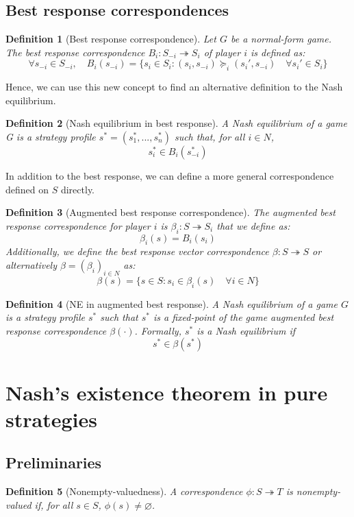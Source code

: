 \documentclass[12pt]{report}
\newtheorem{definition}{Definition}[chapter]
\begin{document}
\subsection{Best response correspondences}

\begin{definition}[Best response correspondence]
Let $G$ be a normal-form game. The best response correspondence $B_i : S_{-i} \twoheadrightarrow S_i$ of player $i$ is defined as: $$\forall s_{-i}\in S_{-i},\quad B_i(s_{-i}) = \{s_i \in S_i : (s_i, s_{-i}) \succeq_i (s_i',s_{-i}) \quad \forall s_i'\in S_i\} $$
\end{definition}
Hence, we can use this new concept to find an alternative definition to the Nash equilibrium.
\begin{definition}[Nash equilibrium in best response]
A Nash equilibrium of a game G is a strategy profile $s^* = (s_1^*, ..., s_n^*)$ such that, for all $i \in N$, $$s_i^*\in B_i(s_{-i}^*)$$
\end{definition}
In addition to the best response, we can define a more general correspondence defined on $S$ directly.
\begin{definition}[Augmented best response correspondence]
The augmented best response correspondence for player $i$ is $\beta_i : S\twoheadrightarrow S_i$ that we define as: $$\beta_i(s) = B_i(s_i)$$ Additionally, we define the best response vector correspondence $\beta : S\twoheadrightarrow S$ or alternatively $\beta = (\beta_i)_{i\in N}$ as: $$\beta(s) = \{s\in S :   s_i\in\beta_i(s)\quad \forall i\in N\}$$
\end{definition}

\begin{definition}[NE in augmented best response]
A Nash equilibrium of a game $G$ is a strategy profile $s^*$ such that $s^*$ is a fixed-point of the game augmented best response correspondence $\beta(\cdot)$. Formally, $s^*$ is a Nash equilibrium if $$s^*\in\beta(s^*)$$
\end{definition}

\section{Nash's existence theorem in pure strategies}

\subsection{Preliminaries}

\begin{definition}[Nonempty-valuedness]
A correspondence $\phi:S\twoheadrightarrow T$ is nonempty-valued if, for all $s\in S$, $\phi(s)\neq\varnothing$.
\end{definition}
\end{document}
